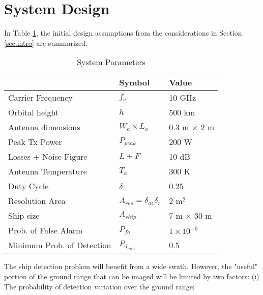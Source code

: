 \documentclass[conference,a4paper]{IEEEtran}
\begin{document}
    \section{System Design}
    \label{sec:systemDesign}
    In Table \ref{tab:parameters}, the initial design assumptions from the considerations in Section \ref{sec:intro} are summarized.
    \begin{table}[h]
        \caption{System Parameters}
        \label{tab:parameters}
        \centering
        \begin{tabular}{|l|l|l|}
            \hline
            & \textbf{Symbol}                       & \textbf{Value}     \\ \hline
            Carrier Frequency          & $f_c$                                 & 10 GHz             \\ \hline
            Orbital height             & $h$                                   & 500 km             \\ \hline
            Antenna dimensions         & $W_a \times L_a$                      & 0.3 m $\times$ 2 m \\ \hline
            Peak Tx Power              & $P_{peak}$                            & 200 W              \\ \hline
            Losses + Noise Figure      & $L+F$                                 & 10 dB              \\ \hline
            Antenna Temperature        & $T_a$                                 & 300 K              \\ \hline
            Duty Cycle                 & $\delta$                              & 0.25               \\ \hline
            Resolution Area            & $A_{res}=\delta_{az}\delta_{r}$       & 2 m$^2$            \\ \hline
            Ship size                  & $A_{ship}$                            & 7 m $\times$ 30 m  \\ \hline
            Prob. of False Alarm       & $P_{fa}$                              & $1\times 10^{-6}$  \\ \hline
            Minimum Prob. of Detection & $P_{d_{min}}$ \rule[-1.1mm]{0mm}{1mm} & 0.5                \\ \hline
        \end{tabular}
    \end{table}
    The ship detection problem will benefit from a wide swath.
    However, the "useful" portion of the ground range that can be imaged will be limited by two factors: (i) The probability of detection variation over the ground range;
\end{document}
